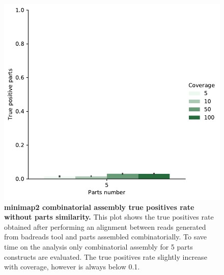 \documentclass[11pt, a4paper]{article}
\begin{document}
 \begin{figure}[ht]
    \begin{center}
    \includegraphics[width=1\textwidth]{../results/images_notebook/v_400/combinatorial_sim_00_true_positive.pdf}
    \end{center}
    \caption{{\bf  minimap2 combinatorial assembly true positives rate without parts similarity.} This plot shows the true positives rate obtained after performing an alignment between reads generated from badreads tool and parts assembled combinatorially. To save time on the analysis only combinatorial assembly for 5 parts constructs are evaluated. The true positives rate slightly increase with coverage, however is always below 0.1.  }
   \label{fig:v_400_combinatorial_sim_00}
\end{figure}
 
\end{document}
